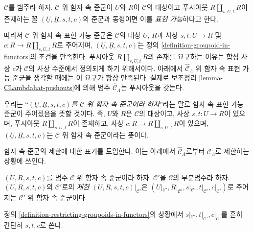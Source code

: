 \begin{definition}
\label{definition-representable}
$\mathcal{C}$를 범주라 하자. $\mathcal{C}$ 위 함자 속 준군이
$U$와 $R$이 $\mathcal{C}$의 대상이고 푸시아웃
$R \amalg_{s, U, t} R$이 존재하는 꼴
$(\underline{U}, \underline{R}, s, t, c)$의 준군과 동형이면
이를 {\it 표현 가능}하다고 한다.
\end{definition}

\begin{remark}
\label{remark-reason-existence-coproduct}
따라서 $\mathcal{C}$ 위 함자 속 표현 가능 준군은 $\mathcal{C}$의 대상
$U$, $R$과 사상 $s, t : U \to R$ 및
$c : R \to R \amalg_{s, U, t} R$로 주어지며,
$(\underline{U}, \underline{R}, s, t, c)$는 정의
\ref{definition-groupoid-in-functors}의 조건을 만족한다.
푸시아웃 $R \amalg_{s, U, t} R$의 존재를 요구하는 이유는 합성 사상
$c$가 $\mathcal{C}$의 사상 수준에서 정의되게 하기 위해서이다.
아래에서 $\widehat{\mathcal{C}}_\Lambda$ 위 함자 속 표현 가능 준군을
생각할 때에는 이 요구가 항상 만족된다. 실제로 보조정리
\ref{lemma-CLambdahat-pushouts}에 의해 범주
$\widehat{\mathcal{C}}_\Lambda$는 푸시아웃을 갖는다.
\end{remark}

\begin{remark}
\label{remark-simplify-terminology}
우리는 ``{\it $(\underline{U}, \underline{R}, s, t, c)$를
$\mathcal{C}$ 위 함자 속 준군이라 하자}''라는 말로 함자 속 표현 가능
준군이 주어졌음을 뜻할 것이다. 즉, $U$와 $R$은 $\mathcal{C}$의 대상이고,
사상 $s, t : U \to R$이 있으며, 푸시아웃
$R \amalg_{s, U, t} R$이 존재하고, 사상
$c : R \to R \amalg_{s, U, t} R$이 있으며,
$(\underline{U}, \underline{R}, s, t, c)$는
$\mathcal{C}$ 위 함자 속 준군이라는 뜻이다.
\end{remark}

\noindent
함자 속 준군의 제한에 대한 표기를 도입한다. 이는 아래에서
$\widehat{\mathcal C}_\Lambda$로부터 $\mathcal{C}_\Lambda$로
제한하는 상황에 쓰인다.

\begin{definition}
\label{definition-restricting-groupoids-in-functors}
$(U, R, s, t, c)$를 범주 $\mathcal{C}$ 위 함자 속 준군이라 하자.
$\mathcal{C}'$을 $\mathcal{C}$의 부분범주라 하자.
$(U, R, s, t, c)$의 $\mathcal{C}'$로의
{\it 제한 $(U, R, s, t, c)|_{\mathcal{C}'}$}은
$(U|_{\mathcal{C}'}, R|_{\mathcal
C'}, s|_{\mathcal{C}'}, t|_{\mathcal{C}'}, c|_{\mathcal{C}'})$로
주어지는 $\mathcal{C}'$ 위 함자 속 준군이다.
\end{definition}

\begin{remark}
\label{remark-notation-restriction}
정의 \ref{definition-restricting-groupoids-in-functors}의 상황에서
$s|_{\mathcal{C}'}, t|_{\mathcal{C}'}, c|_{\mathcal{C}'}$를 흔히
간단히 $s, t, c$로 쓴다.
\end{remark}

